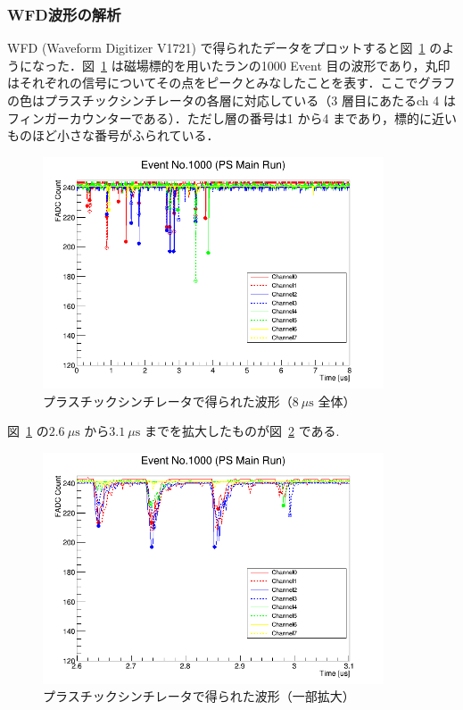 \subsubsection{WFD波形の解析}
\label{subsubsec:PSEventDisplay}
WFD (Waveform Digitizer V1721) で得られたデータをプロットすると図~\ref{fig:PSEventDisplayAll} のようになった．図~\ref{fig:PSEventDisplayAll} は磁場標的を用いたランの1000 Event 目の波形であり，丸印はそれぞれの信号についてその点をピークとみなしたことを表す．ここでグラフの色はプラスチックシンチレータの各層に対応している（3 層目にあたるch 4 はフィンガーカウンターである）．ただし層の番号は1 から4 まであり，標的に近いものほど小さな番号がふられている．
\begin{figure}[h]
	\centering
	\includegraphics[width = 0.9\textwidth]{figure/odagawa/PSEventDisplayAll.png}
	\caption{プラスチックシンチレータで得られた波形（$8~\mu\mathrm{s}$ 全体）}
	\label{fig:PSEventDisplayAll}
\end{figure}%

図~\ref{fig:PSEventDisplayAll} の$2.6~\mu\mathrm{s}$ から$3.1~\mu\mathrm{s}$ までを拡大したものが図~\ref{fig:PSEventDisplayZoom} である.
\begin{figure}[h]
	\centering
	\includegraphics[width = 0.9\textwidth]{figure/odagawa/PSEventDisplayZoom.png}
	\caption{プラスチックシンチレータで得られた波形（一部拡大）}
	\label{fig:PSEventDisplayZoom}
\end{figure}%

